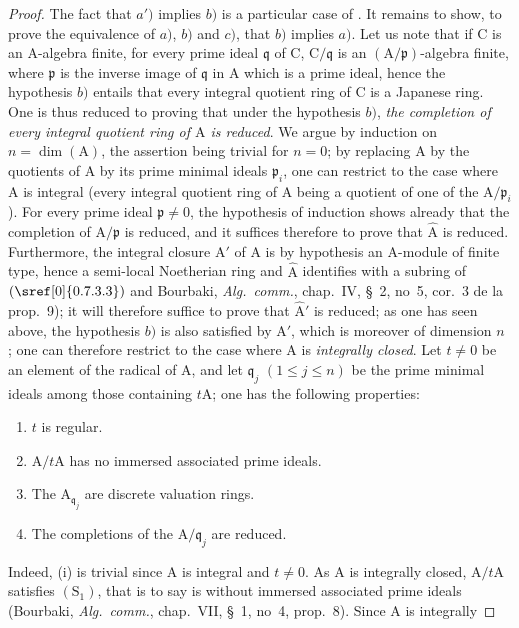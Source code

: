 \begin{proof}
The fact that $a')$ implies $b)$ is a particular case of . It remains to show, to prove the equivalence of $a)$, $b)$ and $c)$, that $b)$ implies $a)$. Let us note that if $\mathrm{C}$ is an $\mathrm{A}$-algebra finite, for every prime ideal $\mathfrak{q}$ of $\mathrm{C}$, $\mathrm{C}/\mathfrak{q}$ is an $(\mathrm{A}/\mathfrak{p})$-algebra finite, where $\mathfrak{p}$ is the inverse image of $\mathfrak{q}$ in $\mathrm{A}$ which is a prime ideal, hence the hypothesis $b)$ entails that every integral quotient ring of $\mathrm{C}$ is a Japanese ring. One is thus reduced to proving that under the hypothesis $b)$, \emph{the completion of every integral quotient ring of $\mathrm{A}$ is reduced}. We argue by induction on $n=\dim(\mathrm{A})$, the assertion being trivial for $n=0$; by replacing $\mathrm{A}$ by the quotients of $\mathrm{A}$ by its prime minimal ideals $\mathfrak{p}_i$, one can restrict to the case where $\mathrm{A}$ is integral (every integral quotient ring of $\mathrm{A}$ being a quotient of one of the $\mathrm{A}/\mathfrak{p}_i$). For every prime ideal $\mathfrak{p}\neq 0$, the hypothesis of induction shows already that the completion of $\mathrm{A}/\mathfrak{p}$ is reduced, and it suffices therefore to prove that $\widehat{\mathrm{A}}$ is reduced. Furthermore, the integral closure $\mathrm{A}'$ of $\mathrm{A}$ is by hypothesis an $\mathrm{A}$-module of finite type, hence a semi-local Noetherian ring and $\widehat{\mathrm{A}}$ identifies with a subring of $(\sref[0]{0.7.3.3})$ and Bourbaki, \emph{Alg.\ comm.}, chap.~IV, \S~2, no~5, cor.~3 de la prop.~9); it will therefore suffice to prove that $\widehat{\mathrm{A}}'$ is reduced; as one has seen above, the hypothesis $b)$ is also satisfied by $\mathrm{A}'$, which is moreover of dimension $n$ ; one can therefore restrict to the case where $\mathrm{A}$ is \emph{integrally closed}. Let $t\neq 0$ be an element of the radical of $\mathrm{A}$, and let $\mathfrak{q}_j$ $(1\leqslant j\leqslant n)$ be the prime minimal ideals among those containing $t\mathrm{A}$; one has the following properties:
\begin{enumerate}[label=(\roman*)]
  \item $t$ is regular.
  \item $\mathrm{A}/t\mathrm{A}$ has no immersed associated prime ideals.
  \item The $\mathrm{A}_{\mathfrak{q}_j}$ are discrete valuation rings.
  \item The completions of the $\mathrm{A}/\mathfrak{q}_j$ are reduced.
\end{enumerate}
Indeed, (i) is trivial since $\mathrm{A}$ is integral and $t\neq 0$. As $\mathrm{A}$ is integrally closed, $\mathrm{A}/t\mathrm{A}$ satisfies $(\mathrm{S}_1)$, that is to say  is without immersed associated prime ideals (Bourbaki, \emph{Alg.\ comm.}, chap.~VII, \S~1, no~4, prop.~8). Since $\mathrm{A}$ is integrally


\end{proof}
